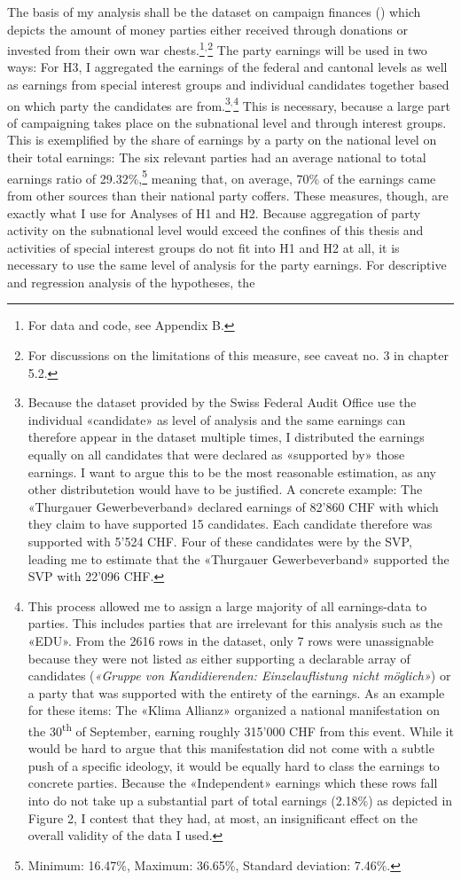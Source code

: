 \documentclass[11pt,a4paper]{article}
\begin{document}
The basis of my analysis shall be the dataset on campaign finances (\cite{swiss_federal_audit_office_kampagnenfinanzierung_2023}) which depicts the amount of money parties either received through donations or invested from their own war chests.\footnote{ For data and code, see Appendix B.}$^, $\footnote{For discussions on the limitations of this measure, see caveat no. 3 in chapter 5.2.} The party earnings will be used in two ways: For H3, I aggregated the earnings of the federal and cantonal levels as well as earnings from special interest groups and individual candidates together based on which party the candidates are from.\footnote{Because the dataset provided by the Swiss Federal Audit Office use the individual «candidate» as level of analysis and the same earnings can therefore appear in the dataset multiple times, I distributed the earnings equally on all candidates that were declared as «supported by» those earnings. I want to argue this to be the most reasonable estimation, as any other distributetion would have to be justified. A concrete example: The «Thurgauer Gewerbeverband» declared earnings of 82’860 CHF with which they claim to have supported 15 candidates. Each candidate therefore was supported with 5’524 CHF. Four of these candidates were by the SVP, leading me to estimate that the «Thurgauer Gewerbeverband» supported the SVP with 22’096 CHF.}$^{, }$\footnote{This process allowed me to assign a large majority of all earnings-data to parties. This includes parties that are irrelevant for this analysis such as the «EDU». From the 2616 rows in the dataset, only 7 rows were unassignable because they were not listed as either supporting a declarable array of candidates (\textit{«Gruppe von Kandidierenden: Einzelauflistung nicht möglich»}) or a party that was supported with the entirety of the earnings. As an example for these items: The «Klima Allianz» organized a national manifestation on the 30\textsuperscript{th} of September, earning roughly 315’000 CHF from this event. While it would be hard to argue that this manifestation did not come with a subtle push of a specific ideology, it would be equally hard to class the earnings to concrete parties. Because the «Independent» earnings which these rows fall into do not take up a substantial part of total earnings (2.18\%) as depicted in Figure 2, I contest that they had, at most, an insignificant effect on the overall validity of the data I used.} This is necessary, because a large part of campaigning takes place on the subnational level and through interest groups. This is exemplified by the share of earnings by a party on the national level on their total earnings: The six relevant parties had an average national to total earnings ratio of 29.32\%,\footnote{ Minimum: 16.47\%, Maximum: 36.65\%, Standard deviation: 7.46\%.} meaning that, on average, 70\% of the earnings came from other sources than their national party coffers. These measures, though, are exactly what I use for Analyses of H1 and H2. Because aggregation of party activity on the subnational level would exceed the confines of this thesis and activities of special interest groups do not fit into H1 and H2 at all, it is necessary to use the same level of analysis for the party earnings. For descriptive and regression analysis of the hypotheses, the 
\end{document}
